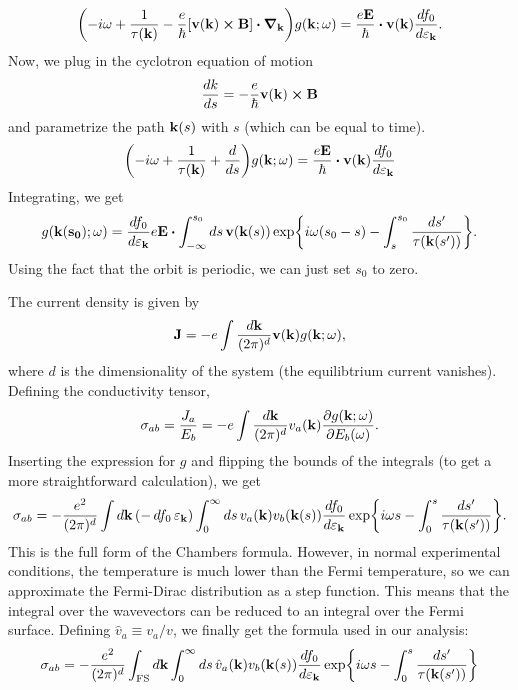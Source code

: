 \begin{equation}
    \qty(-i\omega + \frac{1}{\tau(\vb{k})}
    - \frac{e}{\hbar}[\vb{v}(\vb{k})\cross\vb{B}]\vdot\grad_{\vb{k}})
    g(\vb{k}; \omega) = \frac{e\vb{E}}{\hbar}\vdot\vb{v}(\vb{k})\dv{f_0}{\varepsilon_{\vb{k}}}.
\end{equation}
Now, we plug in the cyclotron equation of motion
\begin{equation}
    \dv{k}{s} = -\frac{e}{\hbar}\vb{v}(\vb{k})\cross\vb{B}
\end{equation}
and parametrize the path $\vb{k}(s)$ with $s$ (which can be equal to time).
\begin{equation}
    \qty(-i\omega + \frac{1}{\tau(\vb{k})} + \dv{s})g(\vb{k}; \omega)
    = \frac{e\vb{E}}{\hbar}\vdot\vb{v}(\vb{k})\dv{f_0}{\varepsilon_{\vb{k}}}
\end{equation}
Integrating, we get
\begin{equation}
    g(\vb{k(s_0)}; \omega) = \dv{f_0}{\varepsilon_{\vb{k}}}e\vb{E}\vdot\int_{-\infty}^{s_0}
    \dd{s}\vb{v}(\vb{k}(s))\exp{i\omega(s_0 - s) - \int_s^{s_0}\frac{\dd{s'}}{\tau(\vb{k}(s'))}}.
\end{equation}
Using the fact that the orbit is periodic, we can just set $s_0$ to zero.

The current density is given by
\begin{equation}
    \vb{J} = -e\int\frac{\dd{\vb{k}}}{(2\pi)^d}\vb{v}(\vb{k})g(\vb{k}; \omega),
\end{equation}
where $d$ is the dimensionality of the system (the equilibtrium current vanishes).
Defining the conductivity tensor,
\begin{equation}
    \sigma_{ab} = \frac{J_a}{E_b} = -e\int\frac{\dd{\vb{k}}}{(2\pi)^d}
    v_a(\vb{k})\pdv{g(\vb{k}; \omega)}{E_b(\vb{\omega})}.
\end{equation}
Inserting the expression for $g$ and flipping the bounds of the integrals (to get a more
straightforward calculation), we get
\begin{equation}
    \sigma_{ab} = -\frac{e^2}{(2\pi)^d}\int\dd{\vb{k}}\qty(-\dd{f_0}{\varepsilon_{\vb{k}}})
    \int_0^\infty\dd{s}v_a(\vb{k})v_b(\vb{k}(s))\dv{f_0}{\varepsilon_{\vb{k}}}
    \exp{i\omega s - \int_0^s\frac{\dd{s'}}{\tau(\vb{k}(s'))}}.
\end{equation}
This is the full form of the Chambers formula. However, in normal experimental conditions,
the temperature is much lower than the Fermi temperature, so we can approximate the Fermi-Dirac
distribution as a step function. This means that the integral over the wavevectors can be reduced
to an integral over the Fermi surface. Defining $\hat{v}_a\equiv v_a/v$, we finally get the formula
used in our analysis:
\begin{equation}
    \sigma_{ab} = -\frac{e^2}{(2\pi)^d}\int_{\mathrm{FS}}\dd{\vb{k}}
    \int_0^\infty\dd{s}\hat{v}_a(\vb{k})v_b(\vb{k}(s))\dv{f_0}{\varepsilon_{\vb{k}}}
    \exp{i\omega s - \int_0^s\frac{\dd{s'}}{\tau(\vb{k}(s'))}}
\end{equation}
